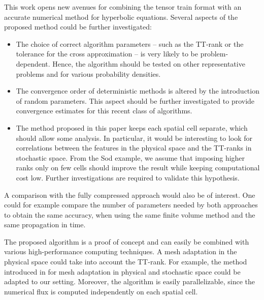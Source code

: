 \documentclass{article}
\begin{document}
This work opens new avenues for combining the tensor train format with an accurate numerical method for hyperbolic equations. 
Several aspects of the proposed method could be further investigated:
\begin{itemize}
	\item The choice of correct algorithm parameters -- such as the TT-rank or the tolerance for the cross approximation -- is very likely to be problem-dependent. 
    Hence, the algorithm should be tested on other representative problems and for various probability densities. 
	
	\item The convergence order of deterministic methods is altered by the introduction of random parameters. 
    This aspect should be further investigated to provide convergence estimates for this recent class of algorithms. 
	
    \item The method proposed in this paper keeps each spatial cell separate, which should allow some analysis. 
    In particular, it would be interesting to look for correlations between the features in the physical space and the TT-ranks in stochastic space. 
    From the Sod example, we assume that imposing higher ranks only on few cells should improve the result while keeping computational cost low. Further investigations are required to validate this hypothesis.
\end{itemize}
A comparison with the fully compressed approach \cite{walton_tensor-train_2024} would also be of interest. 
One could for example compare the number of parameters needed by both approaches to obtain the same accuracy, when using the same finite volume method and the same propagation in time.

The proposed algorithm is a proof of concept and can easily be combined with various high-performance computing techniques. 
A mesh adaptation in the physical space could take into account the TT-rank. 
For example, the method introduced in \cite{herty_multiresolution_2024,HertyKolbMueller:2024,Kolb:2024} for mesh adaptation in physical and stochastic space could be adapted to our setting. 
Moreover, the algorithm is easily parallelizable, since the numerical flux is computed independently on each spatial cell. 
\end{document}
